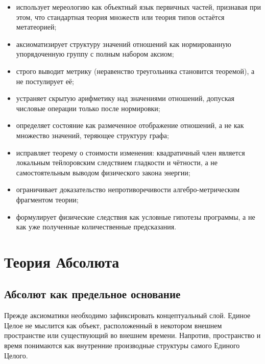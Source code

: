 \documentclass[12pt,a4paper,oneside]{book}
\theoremstyle{definition}
\theoremstyle{plain}
\theoremstyle{remark}
\begin{document}
\begin{itemize}
    \item использует мереологию как объектный язык первичных частей, признавая при
    этом, что стандартная теория множеств или теория типов остаётся метатеорией;
    \item аксиоматизирует структуру значений отношений как нормированную
    упорядоченную группу с полным набором аксиом;
    \item строго выводит метрику (неравенство треугольника становится теоремой),
    а не постулирует её;
    \item устраняет скрытую арифметику над значениями отношений, допуская числовые
    операции только после нормировки;
    \item определяет состояние как размеченное отображение отношений, а не как
    множество значений, теряющее структуру графа;
    \item исправляет теорему о стоимости изменения: квадратичный член является
    локальным тейлоровским следствием гладкости и чётности, а не самостоятельным
    выводом физического закона энергии;
    \item ограничивает доказательство непротиворечивости алгебро-метрическим
    фрагментом теории;
    \item формулирует физические следствия как условные гипотезы программы, а не как
    уже полученные количественные предсказания.
\end{itemize}

\tableofcontents

\mainmatter
\setcounter{chapter}{-1}

\chapter{Теория Абсолюта}

\section{Абсолют как предельное основание}

Прежде аксиоматики необходимо зафиксировать концептуальный слой. Единое Целое не
мыслится как объект, расположенный в некотором внешнем пространстве или существующий
во внешнем времени. Напротив, пространство и время понимаются как внутренние
производные структуры самого Единого Целого.
\end{document}
